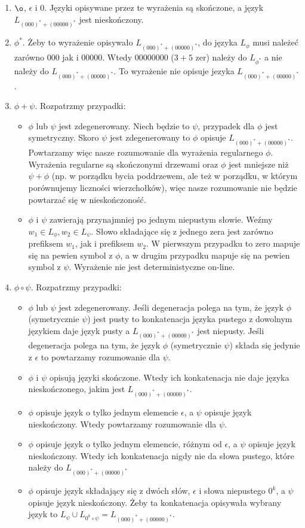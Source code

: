 \documentclass[a4paper]{article}
\begin{document}
\begin{enumerate}
\item $\o$, $\epsilon$ i $0$. Języki opisywane przez te wyrażenia są skończone, a język $L_{(000)^* + (00000)^*}$ jest nieskończony.
\item $\phi^*$. Żeby to wyrażenie opisywało $L_{(000)^* + (00000)^*}$, do języka $L_{\phi}$ musi należeć zarówno $000$ jak i $00000$. Wtedy $00000000$ ($3+5$ zer) należy do $L_{\phi^*}$ a nie należy do $L_{(000)^* + (00000)^*}$. To wyrażenie nie opisuje jezyka $L_{(000)^* + (00000)^*}$.
\item $\phi + \psi$. Rozpatrzmy przypadki:
  \begin{itemize}
    \item $\phi$ lub $\psi$ jest zdegenerowany. Niech będzie to $\psi$, przypadek dla $\phi$ jest symetryczny. Skoro $\psi$ jest zdegenerowany to $\phi$ opisuje $L_{(000)^* + (00000)^*}$. Powtarzamy więc nasze rozumowanie dla wyrażenia regularnego $\phi$. Wyrażenia regularne są skończonymi drzewami oraz $\phi$ jest mniejsze niż $\psi + \phi$ (np. w porządku bycia poddrzewem, ale też w porządku, w którym porównujemy liczności wierzchołków), więc nasze rozumowanie nie będzie powtarzać się w nieskończoność.
    \item $\phi$ i $\psi$ zawierają przynajmniej po jednym niepustym słowie. Weźmy $w_1 \in L_{\phi}, w_2 \in L_{\psi}$. Słowo składające się z jednego zera jest zarówno prefiksem $w_1$, jak i prefiksem $w_2$. W pierwszym przypadku to zero mapuje się na pewien symbol z $\phi$, a w drugim przypadku mapuje się na pewien symbol z $\psi$. Wyrażenie nie jest deterministyczne on-line.
  \end{itemize}
\item $\phi \circ \psi$. Rozpatrzmy przypadki:
  \begin{itemize}
  \item $\phi$ lub $\psi$ jest zdegenerowany. Jeśli degeneracja polega na tym, że język $\phi$ (symetrycznie $\psi$) jest pusty to konkatenacja języka pustego z dowolnym językiem daje język pusty a $L_{(000)^* + (00000)^*}$ jest niepusty. Jeśli degeneracja polega na tym, że język $\phi$ (symetrycznie $\psi$) składa się jedynie z $\epsilon$ to powtarzamy rozumowanie dla $\psi$.
    \item $\phi$ i $\psi$ opisują języki skończone. Wtedy ich konkatenacja nie daje języka nieskończonego, jakim jest $L_{(000)^* + (00000)^*}$.
    \item $\phi$ opisuje język o tylko jednym elemencie $\epsilon$, a $\psi$ opisuje język nieskończony. Wtedy powtarzamy rozumowanie dla $\psi$.
    \item $\phi$ opisuje język o tylko jednym elemencie, różnym od $\epsilon$, a $\psi$ opisuje język nieskończony. Wtedy ich konkatenacja nigdy nie da słowa pustego, które należy do $L_{(000)^* + (00000)^*}$
    \item $\phi$ opisuje język składający się z dwóch słów, $\epsilon$ i słowa niepustego $0^k$, a $\psi$ opisuje język nieskończony. Żeby ta konkatenacja opisywała wybrany język to $L_{\psi} \cup L_{0^k \circ \psi} = L_{(000)^* + (00000)^*}$.


\end{itemize}
\end{enumerate}
\end{document}
